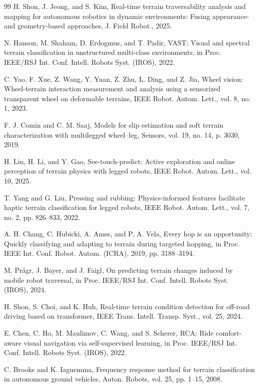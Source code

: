 \documentclass[letterpaper, 10 pt, conference]{ieeeconf}  %
\begin{document}
\begin{thebibliography}{99}
 H. Shon, J. Jeong, and S. Kim, Real-time terrain traversability analysis and mapping for autonomous robotics in dynamic environments: Fusing appearance- and geometry-based approaches, J. Field Robot., 2025.

 N. Hanson, M. Shaham, D. Erdogmus, and T. Padir, VAST: Visual and spectral terrain classification in unstructured multi-class environments, in Proc. IEEE/RSJ Int. Conf. Intell. Robots Syst. (IROS), 2022.

 C. Yao, F. Xue, Z. Wang, Y. Yuan, Z. Zhu, L. Ding, and Z. Jia, Wheel vision: Wheel-terrain interaction measurement and analysis using a sensorized transparent wheel on deformable terrains, IEEE Robot. Autom. Lett., vol. 8, no. 1, 2023.

 F. J. Comin and C. M. Saaj, Models for slip estimation and soft terrain characterization with multilegged wheel–leg, Sensors, vol. 19, no. 14, p. 3030, 2019.

 H. Lin, H. Li, and Y. Gao, See-touch-predict: Active exploration and online perception of terrain physics with legged robots, IEEE Robot. Autom. Lett., vol. 10, 2025.

 T. Yang and G. Liu, Pressing and rubbing: Physics-informed features facilitate haptic terrain classification for legged robots, IEEE Robot. Autom. Lett., vol. 7, no. 2, pp. 826--833, 2022.

 A. H. Chang, C. Hubicki, A. Ames, and P. A. Vela, Every hop is an opportunity: Quickly classifying and adapting to terrain during targeted hopping, in Proc. IEEE Int. Conf. Robot. Autom. (ICRA), 2019, pp. 3188--3194.

 M. Prágr, J. Bayer, and J. Faigl, On predicting terrain changes induced by mobile robot traversal, in Proc. IEEE/RSJ Int. Conf. Intell. Robots Syst. (IROS), 2024.

 H. Shon, S. Choi, and K. Huh, Real-time terrain condition detection for off-road driving based on transformer, IEEE Trans. Intell. Transp. Syst., vol. 25, 2024.

 E. Chen, C. Ho, M. Maulimov, C. Wang, and S. Scherer, RCA: Ride comfort-aware visual navigation via self-supervised learning, in Proc. IEEE/RSJ Int. Conf. Intell. Robots Syst. (IROS), 2022.

 C. Brooks and K. Iagnemma, Frequency response method for terrain classification in autonomous ground vehicles, Auton. Robots, vol. 25, pp. 1--15, 2008.


\end{thebibliography}
\end{document}
